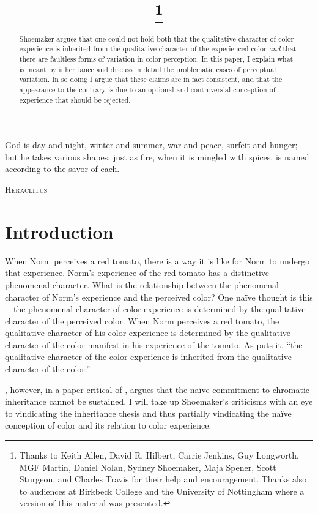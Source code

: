 \documentclass[12pt]{article}
\title{\mytitle\thanks{Thanks to Keith Allen, David R. Hilbert, Carrie Jenkins, Guy Longworth, MGF Martin, Daniel Nolan, Sydney Shoemaker, Maja Spener, Scott Sturgeon, and Charles Travis for their help and encouragement. Thanks also to audiences at Birkbeck College and the University of Nottingham where a version of this material was presented.}}
\author{\myauthor}
\begin{document}
\maketitle

\begin{abstract}
	Shoemaker argues that one could not hold both that the qualitative character of color experience is inherited from the qualitative character of the experienced color \emph{and} that there are faultless forms of variation in color perception. In this paper, I explain what is meant by inheritance and discuss in detail the problematic cases of perceptual variation. In so doing I argue that these claims are in fact consistent, and that the appearance to the contrary is due to an optional and controversial conception of experience that should be rejected.
\end{abstract}


\setlength{\parindent}{1em}


\epigraph{God is day and night, winter and summer, war and peace, surfeit and hunger; but he takes various shapes, just as fire, when it is mingled with spices, is named according to the savor of each.}{\textsc{Heraclitus}}

\section{Introduction}\label{sec:introduction} 

When Norm perceives a red tomato, there is a way it is like for Norm to undergo that experience. Norm's experience of the red tomato has a distinctive phenomenal character. What is the relationship between the phenomenal character of Norm's experience and the perceived color? One na\"ive thought is this---the phenomenal character of color experience is determined by the qualitative character of the perceived color. When Norm perceives a red tomato, the qualitative character of his color experience is determined by the qualitative character of the color manifest in his experience of the tomato. As \citet[189]{Campbell:1997dq} puts it, ``the qualitative character of the color experience is inherited from the qualitative character of the color.''

\cite{Shoemaker:wk}, however, in a paper critical of \cite{Hilbert:2000on}, argues that the na\"ive commitment to chromatic inheritance cannot be sustained. I will take up Shoemaker's criticisms with an eye to vindicating the inheritance thesis and thus partially vindicating the na\"ive conception of color and its relation to color experience.
\end{document}
